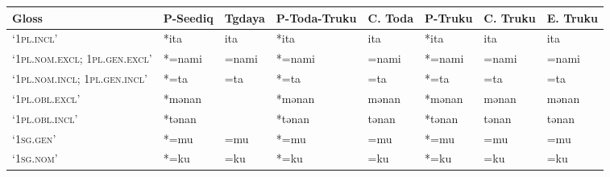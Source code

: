 \begin{landscape}    
\renewcommand{\arraystretch}{1}
\begin{longtable}[c]{@{}p{3cm}<{\raggedright}p{2.75cm}<{\raggedright}p{2.75cm}<{\raggedright}p{2.75cm}<{\raggedright}p{2.75cm}<{\raggedright}p{2.75cm}<{\raggedright}p{2.75cm}<{\raggedright}p{2.75cm}<{\raggedright}@{}}
\textbf{Gloss}   & \textbf{P-Seediq}                         & \textbf{Tgdaya}  & \textbf{P-Toda-Truku}                        & \textbf{C. Toda}  & \textbf{P-Truku}                        & \textbf{C. Truku}            & \textbf{E. Truku}                                                          \\* \midrule
\endhead
%
\endfoot
%
\endlastfoot
%
`\textsc{1pl.incl}'                                  & *ita         & ita                           & *ita           & ita                        & *ita             & ita                      & ita                               \\
`\textsc{1pl.nom.excl; 1pl.gen.excl}'                & *=nami       & =nami                         & *=nami         & =nami                      & *=nami           & =nami                    & =nami                             \\
`\textsc{1pl.nom.incl; 1pl.gen.incl}'                & *=ta         & =ta                           & *=ta           & =ta                        & *=ta             & =ta                      & =ta                               \\
`\textsc{1pl.obl.excl}'                              & *mənan       &                               & *mənan         & mənan                      & *mənan           & mənan                    & mənan                             \\
`\textsc{1pl.obl.incl}'                              & *tənan       &                               & *tənan         & tənan                      & *tənan           & tənan                    & tənan                             \\
`\textsc{1sg.gen}'                                   & *=mu         & =mu                           & *=mu           & =mu                        & *=mu             & =mu                      & =mu                               \\
`\textsc{1sg.nom}'                                   & *=ku         & =ku                           & *=ku           & =ku                        & *=ku             & =ku                      & =ku                               \\

\end{longtable}
\end{landscape}
